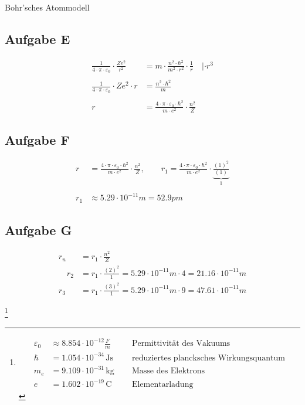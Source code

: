\documentclass[11pt,a4paper,oneside]{article}
\begin{document}
	\begin{loesung}{Bohr'sches Atommodell}
		\subsection*{Aufgabe E}
		\begin{align*}
			\frac{1}{4 \cdot \pi \cdot \varepsilon_0} \cdot \frac{Ze^2}{r^2} &= m \cdot \frac{n^2 \cdot \hbar^2}{m^2 \cdot r^2} \cdot \frac{1}{r} \quad | \cdot r^3 \\\\
			\frac{1}{4 \cdot \pi \cdot \varepsilon_0} \cdot Ze^2 \cdot r&= \frac{n^2 \cdot \hbar^2}{m}\\\\
			r &= \boxed{ \frac{4 \cdot \pi \cdot \varepsilon_0 \cdot \hbar^2}{m \cdot e^2} \cdot \frac{n^2}{Z}}
		\end{align*}
		
		\subsection*{Aufgabe F}
		\begin{align*}
			r &= \frac{4 \cdot \pi \cdot \varepsilon_0 \cdot \hbar^2}{m \cdot e^2} \cdot \frac{n^2}{Z}, \qquad
			r_1 = \frac{4 \cdot \pi \cdot \varepsilon_0 \cdot \hbar^2}{m \cdot e^2} \cdot \underbrace{\frac{(1)^2}{(1)}}_{1}\\\\
			r_1 &\approx \boxed{5.29 \cdot 10^{-11}m = 52.9 pm}
		\end{align*}
		\subsection*{Aufgabe G}
		\begin{align*}
			r_n &= r_1 \cdot \frac{n^2}{Z}\\ \quad
			r_2 &= r_1 \cdot \frac{(2)^2}{1} = 5.29 \cdot 10^{-11}m \cdot 4 = \boxed{21.16 \cdot 10^{-11}m}\\
			r_3 &= r_1 \cdot \frac{(3)^2}{1} = 5.29 \cdot 10^{-11}m \cdot 9 = \boxed{47.61 \cdot 10^{-11}m}
		\end{align*}
	\end{loesung}

	\footnote{
	\begin{align*}
		\varepsilon_0 &\approx 8.854 \cdot 10^{-12} \frac{F}{m} \quad && \text{Permittivität des Vakuums} \\
    	\hbar &= 1.054 \cdot 10^{-34} \, \text{Js} && \text{reduziertes plancksches Wirkungsquantum} \\
		m_e &= 9.109 \cdot 10^{-31} \, \text{kg} && \text{Masse des Elektrons} \\
		e &= 1.602 \cdot 10^{-19} \, \text{C} && \text{Elementarladung}
	\end{align*}
	}
	
\end{document}
